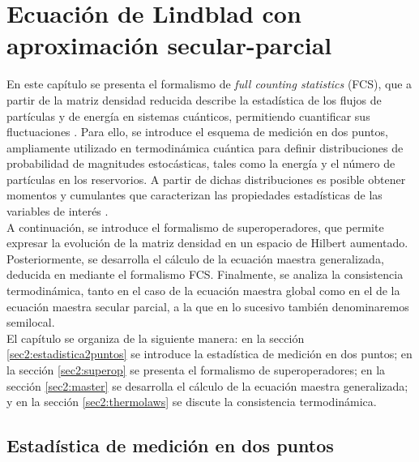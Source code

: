
\chapter{Ecuación de Lindblad con aproximación secular-parcial}

En este capítulo se presenta el formalismo de \textit{full counting statistics} (FCS), que a partir de la matriz densidad reducida describe la estadística de los flujos de partículas y de energía en sistemas cuánticos, permitiendo cuantificar sus fluctuaciones \cite{esposito2009nonequilibrium,landi2024current}. Para ello, se introduce el esquema de medición en dos puntos, ampliamente utilizado en termodinámica cuántica para definir distribuciones de probabilidad de magnitudes estocásticas, tales como la energía y el número de partículas en los reservorios. A partir de dichas distribuciones es posible obtener momentos y cumulantes que caracterizan las propiedades estadísticas de las variables de interés \cite{esposito2009nonequilibrium}.
\\

A continuación, se introduce el formalismo de superoperadores, que permite expresar la evolución de la matriz densidad en un espacio de Hilbert aumentado. Posteriormente, se desarrolla el cálculo de la ecuación maestra generalizada, deducida en \cite{potts2021thermodynamically} mediante el formalismo FCS. Finalmente, se analiza la consistencia termodinámica, tanto en el caso de la ecuación maestra global como en el de la ecuación maestra secular parcial, a la que en lo sucesivo también denominaremos semilocal.
\\

El capítulo se organiza de la siguiente manera: en la sección \ref{sec2:estadistica2puntos} se introduce la estadística de medición en dos puntos; en la sección \ref{sec2:superop} se presenta el formalismo de superoperadores; en la sección \ref{sec2:master} se desarrolla el cálculo de la ecuación maestra generalizada; y en la sección \ref{sec2:thermolaws} se discute la consistencia termodinámica.

\label{sec2:estadistica}

\section{Estadística de medición en dos puntos}

